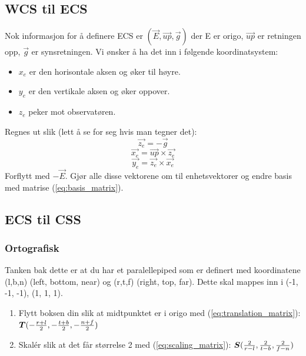 \subsection{WCS til ECS}
Nok informasjon for å definere ECS er $(\vec{E}, \vec{up}, \vec{g})$ der E er origo, $\vec{up}$ er retningen opp, $\vec{g}$ er synsretningen. Vi ønsker å ha det inn i følgende koordinatsystem:
\begin{itemize}
    \item $x_e$ er den horisontale aksen og øker til høyre.
    \item $y_e$ er den vertikale aksen og øker oppover.
    \item $z_e$ peker mot observatøren.
\end{itemize}
Regnes ut slik (lett å se for seg hvis man tegner det):
\begin{equation}
    \vec{z_e} = -\vec{g}
\end{equation}
\begin{equation}
    \vec{x_e} = \vec{up} \times \vec{z_e}
\end{equation}
\begin{equation}
    \vec{y_e} = \vec{z_e} \times \vec{x_e}
\end{equation}
Forflytt med $-\vec{E}$. Gjør alle disse vektorene om til enhetsvektorer og endre basis med matrise (\ref{eq:basis_matrix}).

\subsection{ECS til CSS}
\subsubsection{Ortografisk} \label{subsubsec:ortographic}
Tanken bak dette er at du har et paralellepiped som er definert med koordinatene (l,b,n) (left, bottom, near) og (r,t,f) (right, top, far). Dette skal mappes inn i (-1, -1, -1), (1, 1, 1).
\begin{enumerate}
    \item Flytt boksen din slik at midtpunktet er i origo med (\ref{eq:translation_matrix}): $\boldsymbol{T}(-{r+l \over 2}, -{t+b \over 2}, -{n+f \over 2})$
    \item Skalér slik at det får størrelse 2 med (\ref{eq:scaling_matrix}):
    $\boldsymbol{S}({2 \over r-l}, {2 \over t-b}, {2 \over f-n})$
\end{enumerate}

